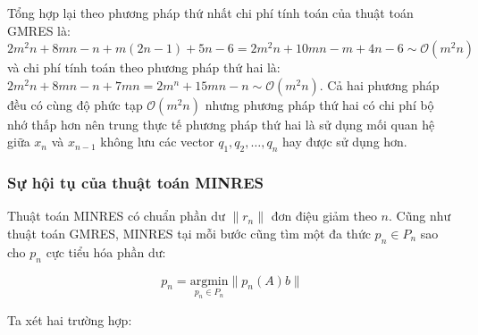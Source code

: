 \documentclass[14pt, a4paper]{article}
\numberwithin{equation}{section}
\numberwithin{algorithm}{section}
\numberwithin{figure}{section}
\numberwithin{dl}{section}
\numberwithin{md}{section}
\numberwithin{bd}{section}
\numberwithin{dn}{section}
\begin{document}
Tổng hợp lại theo phương pháp thứ nhất chi phí tính toán của thuật toán GMRES là: $2m^2n+8mn-n+m(2n-1)+5n-6=2m^2n+10mn-m+4n-6 \sim \mathcal{O}(m^2n)$ và chi phí tính toán theo phương pháp thứ hai là: $2m^2n+8mn-n + 7mn=2m^n+15mn-n \sim \mathcal{O}(m^2n)$. Cả hai phương pháp đều có cùng độ phức tạp $\mathcal{O}(m^2n)$ nhưng phương pháp thứ hai có chi phí bộ nhớ thấp hơn nên trung thực tế phương pháp thứ hai là sử dụng mối quan hệ giữa $x_n$ và $x_{n-1}$ không lưu các vector $q_1, q_2, \dots, q_n$ hay được sử dụng hơn.

\subsubsection{Sự hội tụ của thuật toán MINRES}

Thuật toán MINRES có chuẩn phần dư $\lVert r_n \rVert $ đơn điệu giảm theo $n$. Cũng như thuật toán GMRES, MINRES tại mỗi bước cũng tìm một đa thức $p_n \in P_n$ sao cho $p_n$ cực tiểu hóa phần dư:

\begin{equation}
    p_n = \underset{p_n \in P_n}{\mathrm{argmin}} \lVert p_n(A)b \rVert
\end{equation}

Ta xét hai trường hợp:
\end{document}
